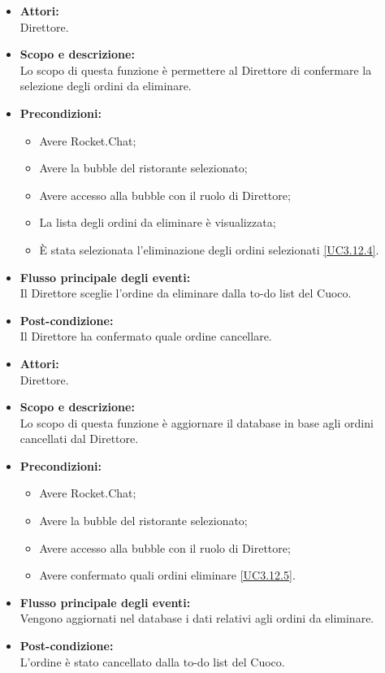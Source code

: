 
\begin{itemize}
	\item \textbf{Attori:}
	\\Direttore.
	\item \textbf{Scopo e descrizione:} 
	\\Lo scopo di questa funzione è permettere al Direttore di confermare la selezione degli ordini da eliminare.
	\item \textbf{Precondizioni:}
	\begin{itemize}
		\item Avere Rocket.Chat;
		\item Avere la bubble del ristorante selezionato;
		\item Avere accesso alla bubble con il ruolo di Direttore;
		\item La lista degli ordini da eliminare è visualizzata;
		\item È stata selezionata l'eliminazione degli ordini selezionati \ref{UC3.12.4}.
	\end{itemize}
	\item \textbf{Flusso principale degli eventi:}
	\\Il Direttore sceglie l'ordine da eliminare dalla to-do list del Cuoco.
	\item \textbf{Post-condizione:}
	\\Il Direttore ha confermato quale ordine cancellare.
\end{itemize}


\begin{itemize}
	\item \textbf{Attori:}
	\\Direttore.
	\item \textbf{Scopo e descrizione:} 
	\\Lo scopo di questa funzione è aggiornare il database in base agli ordini cancellati dal Direttore.
	\item \textbf{Precondizioni:}
	\begin{itemize}
		\item Avere Rocket.Chat;
		\item Avere la bubble del ristorante selezionato;
		\item Avere accesso alla bubble con il ruolo di Direttore;
		\item Avere confermato quali ordini eliminare \ref{UC3.12.5}.
	\end{itemize}
	\item \textbf{Flusso principale degli eventi:}
	\\Vengono aggiornati nel database i dati relativi agli ordini da eliminare.
	\item \textbf{Post-condizione:}
	\\L'ordine è stato cancellato dalla to-do list del Cuoco.
\end{itemize}

